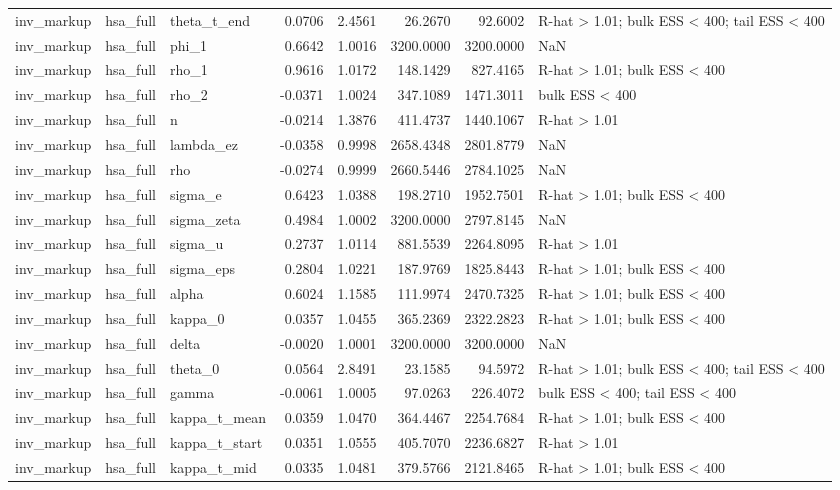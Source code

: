 \begin{tabular}{lllrrrrl}
inv\_markup & hsa\_full & theta\_t\_end & 0.0706 & 2.4561 & 26.2670 & 92.6002 & R-hat > 1.01; bulk ESS < 400; tail ESS < 400 \\
inv\_markup & hsa\_full & phi\_1 & 0.6642 & 1.0016 & 3200.0000 & 3200.0000 & NaN \\
inv\_markup & hsa\_full & rho\_1 & 0.9616 & 1.0172 & 148.1429 & 827.4165 & R-hat > 1.01; bulk ESS < 400 \\
inv\_markup & hsa\_full & rho\_2 & -0.0371 & 1.0024 & 347.1089 & 1471.3011 & bulk ESS < 400 \\
inv\_markup & hsa\_full & n & -0.0214 & 1.3876 & 411.4737 & 1440.1067 & R-hat > 1.01 \\
inv\_markup & hsa\_full & lambda\_ez & -0.0358 & 0.9998 & 2658.4348 & 2801.8779 & NaN \\
inv\_markup & hsa\_full & rho & -0.0274 & 0.9999 & 2660.5446 & 2784.1025 & NaN \\
inv\_markup & hsa\_full & sigma\_e & 0.6423 & 1.0388 & 198.2710 & 1952.7501 & R-hat > 1.01; bulk ESS < 400 \\
inv\_markup & hsa\_full & sigma\_zeta & 0.4984 & 1.0002 & 3200.0000 & 2797.8145 & NaN \\
inv\_markup & hsa\_full & sigma\_u & 0.2737 & 1.0114 & 881.5539 & 2264.8095 & R-hat > 1.01 \\
inv\_markup & hsa\_full & sigma\_eps & 0.2804 & 1.0221 & 187.9769 & 1825.8443 & R-hat > 1.01; bulk ESS < 400 \\
inv\_markup & hsa\_full & alpha & 0.6024 & 1.1585 & 111.9974 & 2470.7325 & R-hat > 1.01; bulk ESS < 400 \\
inv\_markup & hsa\_full & kappa\_0 & 0.0357 & 1.0455 & 365.2369 & 2322.2823 & R-hat > 1.01; bulk ESS < 400 \\
inv\_markup & hsa\_full & delta & -0.0020 & 1.0001 & 3200.0000 & 3200.0000 & NaN \\
inv\_markup & hsa\_full & theta\_0 & 0.0564 & 2.8491 & 23.1585 & 94.5972 & R-hat > 1.01; bulk ESS < 400; tail ESS < 400 \\
inv\_markup & hsa\_full & gamma & -0.0061 & 1.0005 & 97.0263 & 226.4072 & bulk ESS < 400; tail ESS < 400 \\
inv\_markup & hsa\_full & kappa\_t\_mean & 0.0359 & 1.0470 & 364.4467 & 2254.7684 & R-hat > 1.01; bulk ESS < 400 \\
inv\_markup & hsa\_full & kappa\_t\_start & 0.0351 & 1.0555 & 405.7070 & 2236.6827 & R-hat > 1.01 \\
inv\_markup & hsa\_full & kappa\_t\_mid & 0.0335 & 1.0481 & 379.5766 & 2121.8465 & R-hat > 1.01; bulk ESS < 400 \\

\end{tabular}
